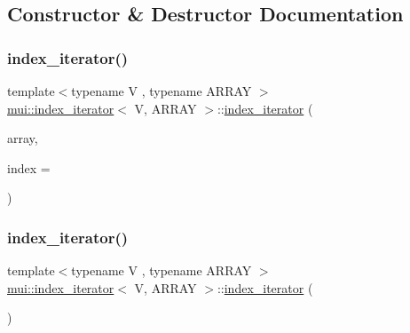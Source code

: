 \subsection{Constructor \& Destructor Documentation}
\mbox{\label{structmui_1_1index__iterator_a974125f59982128660e17777a3b6cea8}} 
\subsubsection{\texorpdfstring{index\+\_\+iterator()}{index\_iterator()}\hspace{0.1cm}{\footnotesize\ttfamily [1/3]}}
{\footnotesize\ttfamily template$<$typename V , typename A\+R\+R\+AY $>$ \\
\hyperlink{structmui_1_1index__iterator}{mui\+::index\+\_\+iterator}$<$ V, A\+R\+R\+AY $>$\+::\hyperlink{structmui_1_1index__iterator}{index\+\_\+iterator} (\begin{DoxyParamCaption}\item[{A\+R\+R\+AY \&}]{array,  }\item[{std\+::size\+\_\+t}]{index = {} }\end{DoxyParamCaption})\hspace{0.3cm}{\ttfamily [inline]}}

\mbox{\label{structmui_1_1index__iterator_aef7a1a21afb42127dff73b2ebcb5c0a7}} 
\subsubsection{\texorpdfstring{index\+\_\+iterator()}{index\_iterator()}\hspace{0.1cm}{\footnotesize\ttfamily [2/3]}}
{\footnotesize\ttfamily template$<$typename V , typename A\+R\+R\+AY $>$ \\
\hyperlink{structmui_1_1index__iterator}{mui\+::index\+\_\+iterator}$<$ V, A\+R\+R\+AY $>$\+::\hyperlink{structmui_1_1index__iterator}{index\+\_\+iterator} (\begin{DoxyParamCaption}{ }\end{DoxyParamCaption})\hspace{0.3cm}{\ttfamily [default]}}

